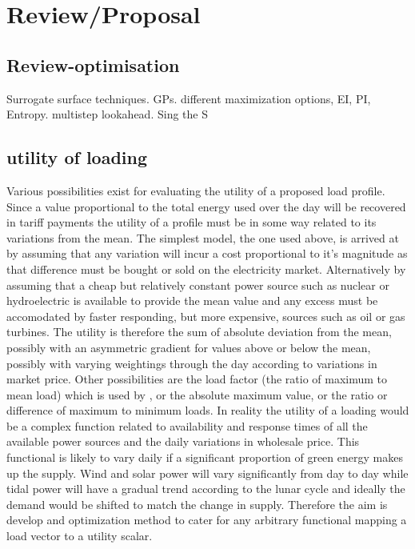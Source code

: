 \documentclass[a4paper, 10 pt, conference]{ieeeconf}  %
\begin{document}
\section{Review/Proposal}
\doublespacing
\subsection{Review-optimisation}
Surrogate surface techniques. GPs. different maximization options, EI, PI, Entropy. multistep lookahead. Sing the S

\subsection{utility of loading}
Various possibilities exist for evaluating the utility of a proposed load profile. Since a value proportional to the total energy used over the day will be recovered in tariff payments the utility of a profile must be in some way related to its variations from the mean. The simplest model, the one used above, is arrived at by assuming that any variation will incur a cost proportional to it's magnitude as that difference must be bought or sold on the electricity market. Alternatively by assuming that a cheap but relatively constant power source such as nuclear or hydroelectric is available to provide the mean value and any excess must be accomodated by faster responding, but more expensive, sources such as oil or gas turbines. The utility is therefore the sum of absolute deviation from the mean, possibly with an asymmetric gradient for values above or below the mean, possibly with varying weightings through the day according to variations in market price.
Other possibilities are the load factor (the ratio of maximum to mean load) which is used by \cite{ramchurn2011agent}, or the absolute maximum value, or the ratio or difference of maximum to minimum loads. In reality the utility of a loading would be a complex function related to availability and response times of all the available power sources and the daily variations in wholesale price. This functional is likely to vary daily if a significant proportion of green energy makes up the supply. Wind and solar power will vary significantly from day to day while tidal power will have a gradual trend according to the lunar cycle and ideally the demand would be shifted to match the change in supply. Therefore the aim is develop and optimization method to cater for any arbitrary functional mapping a load vector to a utility scalar.
\end{document}
